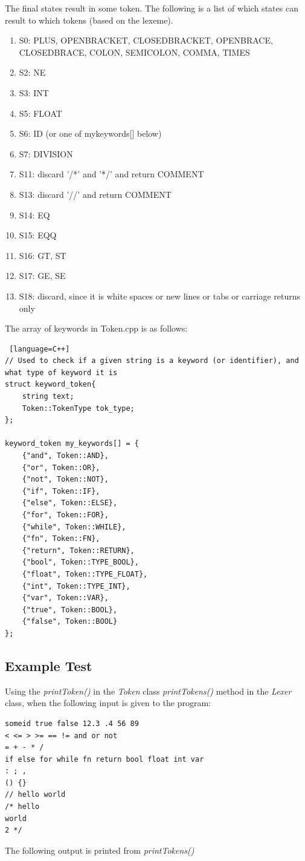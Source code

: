 The final states result in some token. The following is a list of which states can result to which tokens (based on the lexeme).
\begin{enumerate}
	\item S0: PLUS, OPEN\textunderscore BRACKET, CLOSED\textunderscore BRACKET, OPEN\textunderscore BRACE, CLOSED\textunderscore BRACE, COLON, SEMI\textunderscore COLON, COMMA, TIMES
	\item S2: NE
	\item S3: INT
	\item S5: FLOAT
	\item S6: ID (or one of mykeywords[] below)
	\item S7: DIVISION
	\item S11: discard '/*' and '*/' and return COMMENT
	\item S13: discard '//' and return COMMENT
	\item S14: EQ
	\item S15: EQQ
	\item S16: GT, ST
	\item S17: GE, SE
	\item S18: discard, since it is white spaces or new lines or tabs or carriage returns only
\end{enumerate}

\bigskip

The array of keywords in Token.cpp is as follows:
\begin{lstlisting} [language=C++]
// Used to check if a given string is a keyword (or identifier), and what type of keyword it is
struct keyword_token{
	string text;
	Token::TokenType tok_type;
};

keyword_token my_keywords[] = {
	{"and", Token::AND},
	{"or", Token::OR},
	{"not", Token::NOT},
	{"if", Token::IF},
	{"else", Token::ELSE},
	{"for", Token::FOR},
	{"while", Token::WHILE},
	{"fn", Token::FN},
	{"return", Token::RETURN},
	{"bool", Token::TYPE_BOOL},
	{"float", Token::TYPE_FLOAT},
	{"int", Token::TYPE_INT},
	{"var", Token::VAR},
	{"true", Token::BOOL},
	{"false", Token::BOOL}
};
\end{lstlisting}

\subsection{Example Test}
Using the \textit{printToken()} in the \textit{Token} class \textit{printTokens()} method in the \textit{Lexer} class, when the following input is given to the program:
\begin{lstlisting}
someid true false 12.3 .4 56 89
< <= > >= == != and or not
= + - * /
if else for while fn return bool float int var
: ; ,
() {}
// hello world
/* hello 
world
2 */
\end{lstlisting}
The following output is printed from \textit{printTokens()}

